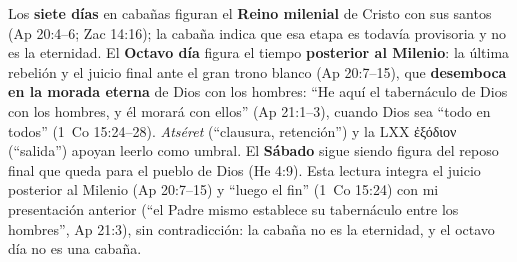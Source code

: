 \documentclass[11pt,letterpaper]{article}
\newcommand{\grc}[1]{\foreignlanguage{ancientgreek}{#1}}
\begin{document}
\begin{tcolorbox}[enhanced,unbreakable,colback=papiro,colframe=tierraroja,boxrule=1pt,arc=3pt,title={\textbf{Lectura de la serie: el Octavo día}},coltitle=papiro,colbacktitle=tierraroja]
\small Los \textbf{siete días} en cabañas figuran el \textbf{Reino milenial} de Cristo con sus santos (Ap 20:4--6; Zac 14:16); la cabaña indica que esa etapa es todavía provisoria y no es la eternidad. El \textbf{Octavo día} figura el tiempo \textbf{posterior al Milenio}: la última rebelión y el juicio final ante el gran trono blanco (Ap 20:7--15), que \textbf{desemboca en la morada eterna} de Dios con los hombres: ``He aquí el tabernáculo de Dios con los hombres, y él morará con ellos'' (Ap 21:1--3), cuando Dios sea ``todo en todos'' (1~Co 15:24--28). \emph{Atséret} (``clausura, retención'') y la LXX \grc{ἐξόδιον} (``salida'') apoyan leerlo como umbral. El \textbf{Sábado} sigue siendo figura del reposo final que queda para el pueblo de Dios (He 4:9). Esta lectura integra el juicio posterior al Milenio (Ap 20:7--15) y ``luego el fin'' (1~Co 15:24) con mi presentación anterior (``el Padre mismo establece su tabernáculo entre los hombres'', Ap 21:3), sin contradicción: la cabaña no es la eternidad, y el octavo día no es una cabaña.
\end{tcolorbox}
\end{document}

